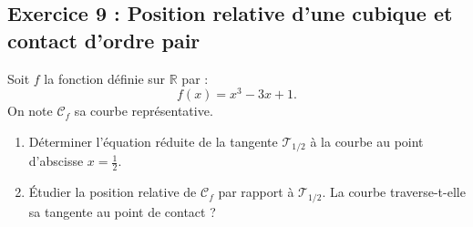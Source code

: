 \documentclass[11pt,a4paper]{article}
\newcommand{\R}{\mathbb{R}}
\begin{document}
\subsection*{Exercice 9 : Position relative d'une cubique et contact d'ordre pair}

Soit $f$ la fonction définie sur $\R$ par :
\[
f(x) = x^3 - 3x + 1.
\]
On note $\mathcal{C}_f$ sa courbe représentative.
\begin{enumerate}[label=\textbf{\arabic*.}]
    \item Déterminer l'équation réduite de la tangente $\mathcal{T}_{1/2}$ à la courbe au point d'abscisse $x = \frac{1}{2}$.
    \item Étudier la position relative de $\mathcal{C}_f$ par rapport à $\mathcal{T}_{1/2}$. La courbe traverse-t-elle sa tangente au point de contact ?
\end{enumerate}
\end{document}
